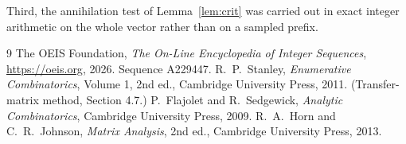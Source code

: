 \documentclass[11pt,a4paper]{article}
\theoremstyle{plain}
\theoremstyle{definition}
\begin{document}
Third, the annihilation test of Lemma~\ref{lem:crit} was carried out in exact integer
arithmetic on the whole vector rather than on a sampled prefix.

\begin{thebibliography}{9}
 The OEIS Foundation, \emph{The On-Line Encyclopedia of Integer
Sequences}, \url{https://oeis.org}, 2026. Sequence A229447.
 R.~P.~Stanley, \emph{Enumerative Combinatorics}, Volume 1, 2nd ed.,
Cambridge University Press, 2011. (Transfer-matrix method, Section 4.7.)
 P.~Flajolet and R.~Sedgewick, \emph{Analytic Combinatorics}, Cambridge
University Press, 2009.
 R.~A.~Horn and C.~R.~Johnson, \emph{Matrix Analysis}, 2nd ed., Cambridge
University Press, 2013.
\end{thebibliography}
\end{document}
